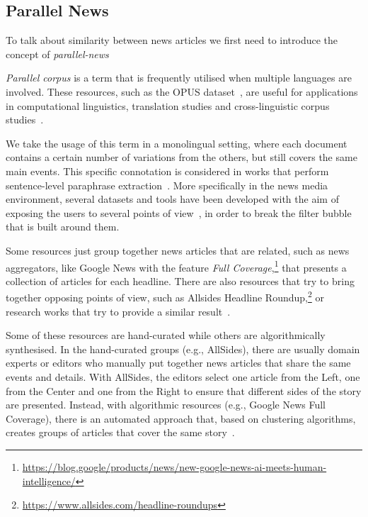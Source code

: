 \subsection{\statusgreen Parallel News}
\label{ssec:lit_relationships_parallel}

To talk about similarity between news articles we first need to introduce the concept of \emph{\gls{parallel-news}}

\emph{Parallel corpus} is a term that is frequently utilised when multiple languages are involved.
These resources, such as the OPUS dataset~\citep{tiedemann2012parallel}, are useful for applications in computational linguistics, translation studies and cross-linguistic corpus studies~\citep{brown1991aligning,ramesh2022samanantar,ziemski2016united,kunchukuttan2017iit,banon2020paracrawl}.

We take the usage of this term in a monolingual setting, where each document contains a certain number of variations from the others, but still covers the same main events.
This specific connotation is considered in works that perform sentence-level paraphrase extraction~\citep{dolan2004unsupervised,zhang2013harvesting}.
More specifically in the news media environment, several datasets and tools have been developed with the aim of exposing the users to several points of view~\citep{bozdag2015breaking}, in order to break the filter bubble~\citep{pariser2011filter} that is built around them.

Some resources just group together news articles that are related, such as news aggregators, like Google News with the feature \emph{Full Coverage},\footnote{\url{https://blog.google/products/news/new-google-news-ai-meets-human-intelligence/}} that presents a collection of articles for each headline.
There are also resources that try to bring together opposing points of view, such as Allsides Headline Roundup,\footnote{\url{https://www.allsides.com/headline-roundups}} or research works that try to provide a similar result~\citep{trampuvs2015diversinews,park2009newscube}.



Some of these resources are hand-curated while others are algorithmically synthesised. In the hand-curated groups (e.g., AllSides), there are usually domain experts or editors who manually put together news articles that share the same events and details. With AllSides, the editors select one article from the Left, one from the Center and one from the Right to ensure that different sides of the story are presented.
Instead, with algorithmic resources (e.g., Google News Full Coverage), there is an automated approach that, based on clustering algorithms, creates groups of articles that cover the same story~\citep{marutho2018determination,alelyani2018feature,karimi2018news}.

